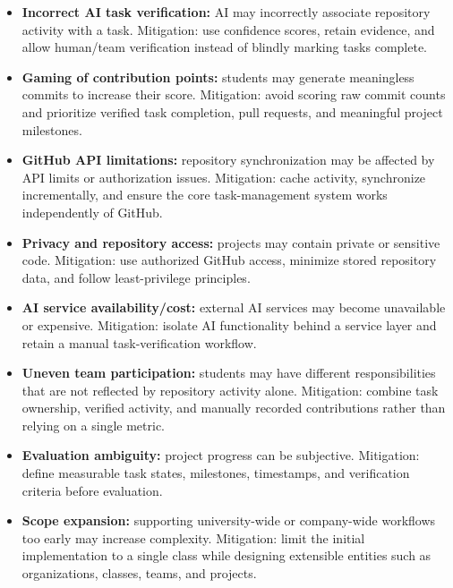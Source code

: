 \documentclass[11pt,a4paper]{article}
\begin{document}
\begin{itemize}[leftmargin=0.7cm]

    \item \textbf{Incorrect AI task verification:} AI may incorrectly associate repository activity with a task. Mitigation: use confidence scores, retain evidence, and allow human/team verification instead of blindly marking tasks complete.

    \item \textbf{Gaming of contribution points:} students may generate meaningless commits to increase their score. Mitigation: avoid scoring raw commit counts and prioritize verified task completion, pull requests, and meaningful project milestones.

    \item \textbf{GitHub API limitations:} repository synchronization may be affected by API limits or authorization issues. Mitigation: cache activity, synchronize incrementally, and ensure the core task-management system works independently of GitHub.

    \item \textbf{Privacy and repository access:} projects may contain private or sensitive code. Mitigation: use authorized GitHub access, minimize stored repository data, and follow least-privilege principles.

    \item \textbf{AI service availability/cost:} external AI services may become unavailable or expensive. Mitigation: isolate AI functionality behind a service layer and retain a manual task-verification workflow.

    \item \textbf{Uneven team participation:} students may have different responsibilities that are not reflected by repository activity alone. Mitigation: combine task ownership, verified activity, and manually recorded contributions rather than relying on a single metric.

    \item \textbf{Evaluation ambiguity:} project progress can be subjective. Mitigation: define measurable task states, milestones, timestamps, and verification criteria before evaluation.

    \item \textbf{Scope expansion:} supporting university-wide or company-wide workflows too early may increase complexity. Mitigation: limit the initial implementation to a single class while designing extensible entities such as organizations, classes, teams, and projects.

\end{itemize}
\end{document}
